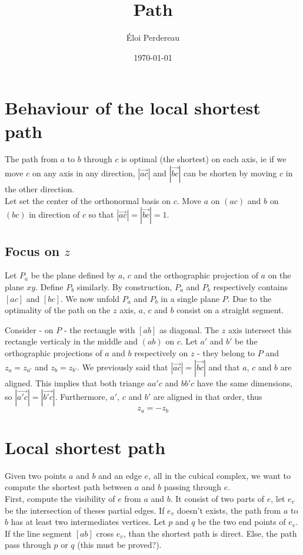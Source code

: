 \documentclass{article}
\title{Path}
\author{\'Eloi Perdereau}
\date{\today}
\begin{document}
\maketitle

\section{Behaviour of the local shortest path}

The path from $a$ to $b$ through $c$ is optimal (the shortest) on each axis, ie if we move $c$ on any axis in any direction, $|\vec{ac}|$ and $|\vec{bc}|$ can be shorten by moving $c$ in the other direction.\\
Let set the center of the orthonormal basis on $c$. Move $a$ on $(ac)$ and $b$ on $(bc)$ in direction of $c$ so that $|\vec{ac}| = |\vec{bc}| = 1$. \\

\subsection{Focus on $z$}
Let $P_a$ be the plane defined by $a$, $c$ and the orthographic projection of $a$ on the plane $xy$. Define $P_b$ similarly. By construction, $P_a$ and $P_b$ respectively contains $[ac]$ and $[bc]$. We now unfold $P_a$ and $P_b$ in a single plane $P$. Due to the optimality of the path on the $z$ axis, $a$, $c$ and $b$ consist on a straight segment.

Consider - on $P$ - the rectangle with $[ab]$ as diagonal. The $z$ axis intersect this rectangle verticaly in the middle and $(ab)$ on $c$. Let $a'$ and $b'$ be the orthographic projections of $a$ and $b$ respectively on $z$ - they belong to $P$ and $z_{a} = z_{a'}$ and $z_{b} = z_{b'}$. We previously said that $|\vec{ac}| = |\vec{bc}|$ and that $a$, $c$ and $b$ are aligned. This implies that both triange $aa'c$ and $bb'c$ have the same dimensions, so $|\vec{a'c}| = |\vec{b'c}|$. Furthermore, $a'$, $c$ and $b'$ are aligned in that order, thus \[z_a = -z_b\]


\section{Local shortest path}

Given two points $a$ and $b$ and an edge $e$, all in the cubical complex, we want to compute the shortest path between $a$ and $b$ passing through $e$. \\

First, compute the visibility of $e$ from $a$ and $b$. It consist of two parts of $e$, let $e_v$ be the intersection of theses partial edges. If $e_v$ doesn't exists, the path from $a$ to $b$ has at least two intermediates vertices. Let $p$ and $q$ be the two end points of $e_v$. If the line segment $[ab]$ cross $e_v$, than the shortest path is direct. Else, the path pass through $p$ or $q$ (this must be proved?).
\end{document}
